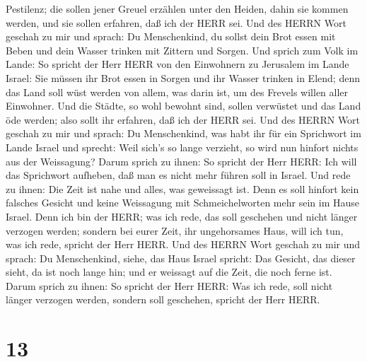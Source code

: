 Pestilenz; die sollen jener Greuel erzählen unter den Heiden, dahin sie
kommen werden, und sie sollen erfahren, daß ich der HERR sei.
 Und des HERRN Wort geschah zu mir und sprach:
 Du Menschenkind, du sollst dein Brot essen mit Beben und
dein Wasser trinken mit Zittern und Sorgen.  Und sprich zum
Volk im Lande: So spricht der Herr HERR von den Einwohnern zu Jerusalem
im Lande Israel: Sie müssen ihr Brot essen in Sorgen und ihr Wasser
trinken in Elend; denn das Land soll wüst werden von allem, was darin
ist, um des Frevels willen aller Einwohner.  Und die
Städte, so wohl bewohnt sind, sollen verwüstet und das Land öde werden;
also sollt ihr erfahren, daß ich der HERR sei.  Und des
HERRN Wort geschah zu mir und sprach:  Du Menschenkind, was
habt ihr für ein Sprichwort im Lande Israel und sprecht: Weil sich's so
lange verzieht, so wird nun hinfort nichts aus der Weissagung?
 Darum sprich zu ihnen: So spricht der Herr HERR: Ich will
das Sprichwort aufheben, daß man es nicht mehr führen soll in Israel.
Und rede zu ihnen: Die Zeit ist nahe und alles, was geweissagt ist.
 Denn es soll hinfort kein falsches Gesicht und keine
Weissagung mit Schmeichelworten mehr sein im Hause Israel. 
Denn ich bin der HERR; was ich rede, das soll geschehen und nicht länger
verzogen werden; sondern bei eurer Zeit, ihr ungehorsames Haus, will ich
tun, was ich rede, spricht der Herr HERR.  Und des HERRN
Wort geschah zu mir und sprach:  Du Menschenkind, siehe,
das Haus Israel spricht: Das Gesicht, das dieser sieht, da ist noch
lange hin; und er weissagt auf die Zeit, die noch ferne ist.
 Darum sprich zu ihnen: So spricht der Herr HERR: Was ich
rede, soll nicht länger verzogen werden, sondern soll geschehen, spricht
der Herr HERR.

\hypertarget{section-12}{%
\section{13}\label{section-12}}

